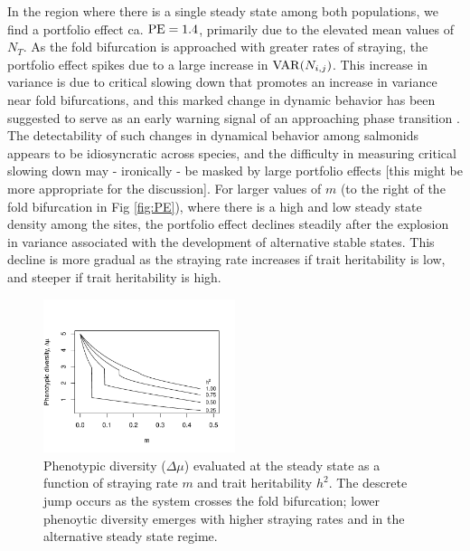 \documentclass[twocolumn,preprintnumbers,amsmath,amssymb,superscriptaddress]{revtex4}
\begin{document}
In the region where there is a single steady state among both populations, we find a portfolio effect ca. ${\rm PE}=1.4$, primarily due to the elevated mean values of $N_T$.
As the fold bifurcation is approached with greater rates of straying, the portfolio effect spikes due to a large increase in ${\rm VAR}(N_{i,j})$.
This increase in variance is due to critical slowing down that promotes an increase in variance near fold bifurcations, and this marked change in dynamic behavior has been suggested to serve as an early warning signal of an approaching phase transition \cite{Scheffer:2009gg,Anonymous:2013br,Dakos:2014br}.
The detectability of such changes in dynamical behavior among salmonids appears to be idiosyncratic across species, and the difficulty in measuring critical slowing down may - ironically - be masked by large portfolio effects \cite{Krkosek:2014ch} [this might be more appropriate for the discussion].
For larger values of $m$ (to the right of the fold bifurcation in Fig \ref{fig:PE}), where there is a high and low steady state density among the sites, the portfolio effect declines steadily after the explosion in variance associated with the development of alternative stable states.
This decline is more gradual as the straying rate increases if trait heritability is low, and steeper if trait heritability is high.


\begin{figure}
  \captionsetup{justification=raggedright,
singlelinecheck=false
}
\centering
\includegraphics[width=0.5\textwidth]{figs2/fig_traitdiff.pdf}
\caption{
Phenotypic diversity ($\Delta \mu$) evaluated at the steady state as a function of straying rate $m$ and trait heritability $h^2$. The descrete jump occurs as the system crosses the fold bifurcation; lower phenoytic diversity emerges with higher straying rates and in the alternative steady state regime. 
} \label{fig:traitdiff}
\end{figure}
\end{document}
